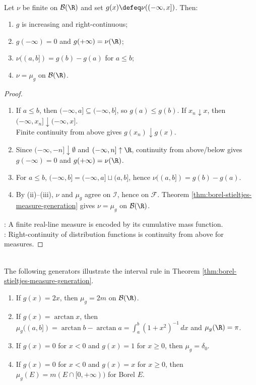 \begin{proposition} \label{prop:finite-borel-measure-distribution-function} \\
Let $\nu$ be finite on $\mathcal{B}(\R)$ and set $g(x)\defeq\nu((-\infty,x])$. Then:
\begin{enumerate}[label=(\roman*)]
\setlength{\itemsep}{0pt}
\item $g$ is increasing and right-continuous;
\item $g(-\infty)=0$ and $g(+\infty)=\nu(\R)$;
\item $\nu((a,b])=g(b)-g(a)$ for $a\leq b$;
\item $\nu=\mu_g$ on $\mathcal{B}(\R)$.
\end{enumerate}
\begin{proof}
\begin{enumerate}[label=(\roman*)]
\setlength{\itemsep}{0pt}
\item If $a\leq b$, then $(-\infty,a]\subseteq(-\infty,b]$, so $g(a)\leq g(b)$. If $x_n\downarrow x$, then $(-\infty,x_n]\downarrow(-\infty,x]$.\\
Finite continuity from above gives $g(x_n)\downarrow g(x)$.
\item Since $(-\infty,-n]\downarrow\emptyset$ and $(-\infty,n]\uparrow\R$, continuity from above/below gives $g(-\infty)=0$ and $g(+\infty)=\nu(\R)$.
\item For $a\leq b$, $(-\infty,b]=(-\infty,a]\sqcup(a,b]$, hence $\nu((a,b])=g(b)-g(a)$.
\item By (ii)--(iii), $\nu$ and $\mu_g$ agree on $\mathcal{I}$, hence on $\mathcal{F}$. Theorem \ref{thm:borel-stieltjes-measure-generation} gives $\nu=\mu_g$ on $\mathcal{B}(\R)$.
\end{enumerate}
: A finite real-line measure is encoded by its cumulative mass function.\\
: Right-continuity of distribution functions is continuity from above for measures.
\end{proof}
\end{proposition}

\begin{example} \label{ex:borel-stieltjes-basic-generators} \\
The following generators illustrate the interval rule in Theorem \ref{thm:borel-stieltjes-measure-generation}.
\begin{enumerate}[label=(\roman*)]
\setlength{\itemsep}{0pt}
\item If $g(x)=2x$, then $\mu_g=2m$ on $\mathcal{B}(\R)$.
\item If $g(x)=\arctan x$, then $\mu_g((a,b])=\arctan b-\arctan a=\int_a^b(1+x^2)^{-1}\,dx$ and $\mu_g(\R)=\pi$.
\item If $g(x)=0$ for $x<0$ and $g(x)=1$ for $x\geq0$, then $\mu_g=\delta_0$.
\item If $g(x)=0$ for $x<0$ and $g(x)=x$ for $x\geq0$, then $\mu_g(E)=m(E\cap[0,+\infty))$ for Borel $E$.
\end{enumerate}
\end{example}

